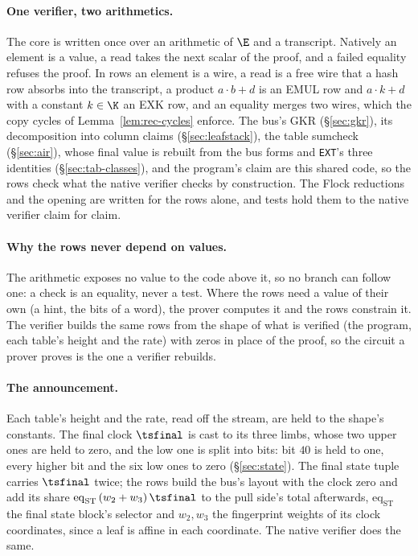 \paragraph{One verifier, two arithmetics.} The core is written once over an arithmetic of $\E$ and a transcript. Natively an element is a value, a read takes the next scalar of the proof, and a failed equality refuses the proof. In rows an element is a wire, a read is a free wire that a hash row absorbs into the transcript, a product $a\cdot b+d$ is an \textsf{EMUL} row and $a\cdot k+d$ with a constant $k\in\K$ an \textsf{EXK} row, and an equality merges two wires, which the copy cycles of Lemma~\ref{lem:rec-cycles} enforce. The bus's GKR (\S\ref{sec:gkr}), its decomposition into column claims (\S\ref{sec:leafstack}), the table sumcheck (\S\ref{sec:air}), whose final value is rebuilt from the bus forms and \texttt{EXT}'s three identities (\S\ref{sec:tab-classes}), and the program's claim are this shared code, so the rows check what the native verifier checks by construction. The Flock reductions and the opening are written for the rows alone, and tests hold them to the native verifier claim for claim.

\paragraph{Why the rows never depend on values.} The arithmetic exposes no value to the code above it, so no branch can follow one: a check is an equality, never a test. Where the rows need a value of their own (a hint, the bits of a word), the prover computes it and the rows constrain it. The verifier builds the same rows from the shape of what is verified (the program, each table's height and the rate) with zeros in place of the proof, so the circuit a prover proves is the one a verifier rebuilds.

\paragraph{The announcement.} Each table's height and the rate, read off the stream, are held to the shape's constants. The final clock $\tsfinal$ is cast to its three limbs, whose two upper ones are held to zero, and the low one is split into bits: bit $40$ is held to one, every higher bit and the six low ones to zero (\S\ref{sec:state}). The final state tuple carries $\tsfinal$ twice; the rows build the bus's layout with the clock zero and add its share $\mathrm{eq}_{\mathrm{ST}}\,(w_2+w_3)\,\tsfinal$ to the pull side's total afterwards, $\mathrm{eq}_{\mathrm{ST}}$ the final state block's selector and $w_2,w_3$ the fingerprint weights of its clock coordinates, since a leaf is affine in each coordinate. The native verifier does the same.

